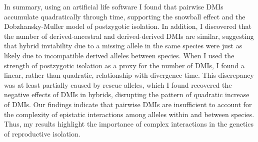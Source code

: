 \begin{doublespace}
%
In summary, using an artificial life software
I found that pairwise DMIs accumulate quadratically through time,
supporting the snowball effect
and the Dob\-zhan\-sky-Mul\-ler model of postzygotic isolation.
%
In addition, I discovered that the number of derived-ancestral 
and derived-derived DMIs are similar,
suggesting that hybrid inviability due to
a missing allele in the same species
were just as likely due to
incompatible derived alleles between species.
%
When I used the strength of postzygotic isolation
as a proxy for the number of DMIs,
I found a linear, rather than quadratic,
relationship with divergence time.
%
This discrepancy was at least partially caused by rescue alleles,
which I found recovered the negative effects of DMIs in hybrids,
disrupting the pattern of quadratic increase of DMIs.
%
Our findings indicate that pairwise DMIs are insufficient
to account for the complexity of epistatic interactions
among alleles within and between species.
%
Thus, my results highlight the importance of complex interactions
in the genetics of reproductive isolation.






%
%
%





\end{doublespace}
